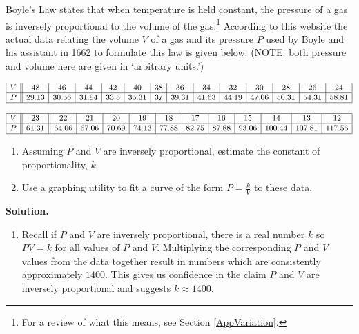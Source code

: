 \documentclass{ximera}
\begin{document}
\begin{example}  \label{BoyleslawRational} Boyle's Law states that when temperature is held constant, the pressure of a gas is inversely proportional to the volume of the gas.\footnote{For a review of what this means, see Section \ref{AppVariation}.}  According to this \href{http://web.lemoyne.edu/~giunta/classicalcs/boyleverify.html}{\underline{website}} the actual data relating the volume $V$ of a gas and its pressure $P$ used by Boyle and his assistant in 1662 to formulate this law is given below. (NOTE: both pressure and volume here are given in `arbitrary units.')

\[ \begin{array}{|c||c|c|c|c|c|c|c|c|c|c|c|c|c|}  \hline

V & 48 & 46 & 44 & 42 & 40 & 38 & 36 & 34 & 32 & 30 & 28 & 26 & 24  \\ \hline

P & 29.13 & 30.56 & 31.94 & 33.5 & 35.31 & 37 & 39.31 & 41.63 & 44.19 & 47.06 & 50.31 & 54.31 & 58.81  \\ \hline \end{array} \]


\[\begin{array}{|c||c||c|c|c|c|c|c|c|c|c|c|c|c|} \hline

V & 23 & 22 & 21 & 20 & 19 & 18 & 17 & 16 & 15 & 14 & 13 & 12  \\ \hline 

P & 61.31 & 64.06 & 67.06 & 70.69 & 74.13 & 77.88 & 82.75 & 87.88 & 93.06 & 100.44 & 107.81 & 117.56   \\ \hline \end{array} \]

\begin{enumerate}

\item Assuming  $P$ and $V$ are inversely proportional, estimate  the constant of proportionality, $k$.

\item Use a graphing utility to fit a curve of the form $P =  \frac{k}{V}$ to these data.  

\end{enumerate}
 
{\bf Solution.}

\begin{enumerate}

\item Recall if $P$ and $V$ are inversely proportional, there is a real number $k$ so $PV = k$ for all values of $P$ and $V$.  Multiplying the corresponding $P$ and $V$ values from the data together result in numbers which are consistently approximately $1400$.  This gives us confidence in the claim $P$ and $V$ are inversely proportional and suggests $k \approx 1400$.


\end{enumerate}
\end{example}
\end{document}
